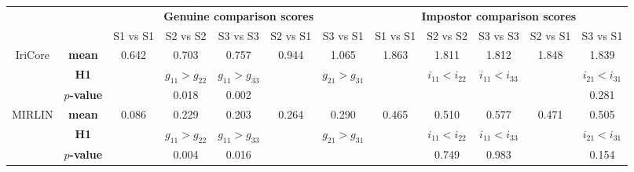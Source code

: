 \documentclass[10pt,twocolumn,letterpaper]{article}
\begin{document}
\begin{table*}[!htb]
\label{magicTable}
\label{table:statTests}
\centering\scriptsize
\begin{tabular}[t]{cc|c|c|c|c|c||c|c|c|c|c|}
\cline{3-12}
& & \multicolumn{5}{c||}{\bf Genuine comparison scores} & \multicolumn{5}{c|}{\bf Impostor comparison scores} \\
\cline{3-12}
& & S1 vs S1 & S2 vs S2 & S3 vs S3 & S2 vs S1 & S3 vs S1  & S1 vs S1 & S2 vs S2 & S3 vs S3 & S2 vs S1 & S3 vs S1  \\\hline\hline
\multicolumn{1}{|c}{\multirow{3}{*}{IriCore}} & \multicolumn{1}{|c|}{\bf mean} & 0.642 & 0.703 & 0.757 & 0.944 & 1.065 & 1.863 & 1.811 & 1.812 & 1.848 & 1.839 \\\cline{2-12}
\multicolumn{1}{|c}{} & \multicolumn{1}{|c|}{\bf H1} &\cellcolor{gray!20}& \cellcolor{green!20} $g_{11} > g_{22}$  & \cellcolor{green!20} $g_{11} > g_{33}$  & \cellcolor{gray!20} & \cellcolor{green!20} $g_{21} > g_{31}$ & \cellcolor{gray!20} & \cellcolor{green!20} $i_{11} < i_{22}$  & \cellcolor{green!20} $i_{11} < i_{33}$  & \cellcolor{gray!20} & \cellcolor{red!20} $i_{21} < i_{31}$  \\\cline{2-12}
\multicolumn{1}{|c}{} & \multicolumn{1}{|c|}{\bf $p$-value} &\cellcolor{gray!20} & 0.018 & 0.002 & \cellcolor{gray!20} & \texttildelow 0 & \cellcolor{gray!20} & \texttildelow 0 & \texttildelow 0 &\cellcolor{gray!20} & 0.281\\\hline

\multicolumn{1}{|c}{\multirow{3}{*}{MIRLIN}} & \multicolumn{1}{|c|}{\bf mean} & 0.086 & 0.229 & 0.203 & 0.264 & 0.290 & 0.465 & 0.510 & 0.577 & 0.471 & 0.505\\\cline{2-12}
\multicolumn{1}{|c}{} & \multicolumn{1}{|c|}{\bf H1} & \cellcolor{gray!20} & \cellcolor{green!20} $g_{11} > g_{22}$  \cellcolor{green!20} & \cellcolor{green!20} $g_{11} > g_{33}$  & \cellcolor{gray!20} & \cellcolor{green!20} $g_{21} > g_{31}$ & \cellcolor{gray!20} & \cellcolor{red!20} $i_{11} < i_{22}$  & \cellcolor{red!20} $i_{11} < i_{33}$  & \cellcolor{gray!20} & \cellcolor{red!20} $i_{21} < i_{31}$  \\\cline{2-12}
\multicolumn{1}{|c}{} & \multicolumn{1}{|c|}{\bf $p$-value} & \cellcolor{gray!20} & 0.004 & 0.016 & \cellcolor{gray!20}  & \texttildelow 0 & \cellcolor{gray!20} & 0.749 & 0.983 & \cellcolor{gray!20}  & 0.154\\\hline


\end{tabular}
\end{table*}
\end{document}
